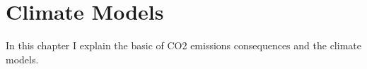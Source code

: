 \setchapterpreamble[u]{\margintoc}
\chapter{Climate Models}

In this chapter I explain the basic of CO2 emissions consequences and the climate models.